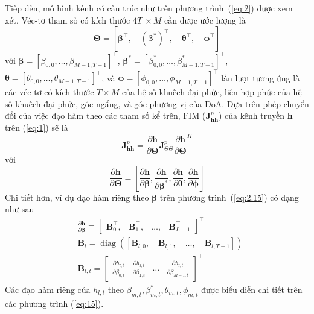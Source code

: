 Tiếp đến, mô hình kênh có cấu trúc như trên phương trình~(\ref{eq:2}) được xem xét. Véc-tơ tham số có kích thước $4T~\times M$ cần được ước lượng là
\begin{equation}
    \boldsymbol{\Theta}=\left[ \boldsymbol{\beta}^\top, \quad \boldsymbol{(\beta^*)}^\top, \quad \boldsymbol{\theta}^\top, \quad \boldsymbol{\phi}^\top \right]
\end{equation}
với $\boldsymbol{\beta}=\left[\beta_{0,0}, \ldots, \beta_{M-1, T -1}\right]^{\top}$, $\boldsymbol{\beta^*}=\left[\beta^*_{0,0}, \ldots, \beta^*_{M-1, T - 1}\right]^{\top}$, $\boldsymbol{\theta}=\left[\theta_{0,0}, \ldots, \theta_{M-1, T - 1}\right]^{\top}$, và $\boldsymbol{\phi}=\left[\phi_{0,0}, \ldots, \phi_{M-1, T - 1}\right]^{\top}$ lần lượt tương ứng là các véc-tơ có kích thước $T \times M$ của hệ số khuếch đại phức, liên hợp phức của hệ số khuếch đại phức, góc ngẩng, và góc phương vị của DoA. Dựa trên phép chuyển đổi của việc đạo hàm theo các tham số kể trên, FIM ($\mathbf{J}^p_{\mathbf{h} \mathbf{h}}$) của kênh truyền $\mathbf{h}$ trên (\ref{eq:1}) sẽ là
\begin{equation}
\label{eq:13}
    \mathbf{J}^p_{\mathbf{h} \mathbf{h}}=\frac{\partial \mathbf{h}}{\partial \boldsymbol{\Theta}} \mathbf{J}^p_{\Theta \Theta} {\frac{\partial \mathbf{h}}{\partial \boldsymbol{\Theta}}}^{H}
\end{equation}
với 
\begin{equation}
\label{eq:2.15}
    \frac{\partial \mathbf{h}}{\partial \boldsymbol{\Theta}}=
    \left[\frac{\partial \mathbf{h}}{\partial \boldsymbol{\beta}}, 
    \frac{\partial \mathbf{h}}{\partial \boldsymbol{\beta^*}},
    \frac{\partial \mathbf{h}}{\partial \boldsymbol{\theta}}, 
    \frac{\partial \mathbf{h}}{\partial \boldsymbol{\phi}}\right]
\end{equation}
Chi tiết hơn, ví dụ đạo hàm riêng theo $\boldsymbol{\beta}$ trên phương trình~(\ref{eq:2.15}) có dạng như sau
\begin{subequations}
    \begin{align}
    &\frac{\partial \mathbf{h}}{\partial \boldsymbol{\beta}}=
    \left[\begin{array}{llll}
        \boldsymbol{B}_{0}^{\top}, & \boldsymbol{B}_{1}^{\top}, & \ldots, & \boldsymbol{B}_{L - 1}^{\top}
    \end{array}\right]^{\top}\\
    &\boldsymbol{B}_{l}=\operatorname{diag}\left(\left[\boldsymbol{B}_{l, 0}, \quad \boldsymbol{B}_{l, 1}, \quad \ldots, \quad \boldsymbol{B}_{l, T - 1}\right]\right) \\
    &\boldsymbol{B}_{l, t}=\left[\begin{array}{cccc}
        \frac{\partial h_{l, t}}{\partial \beta_{0, t}} &
        \frac{\partial h_{l, t}}{\partial \beta_{1, t}} & 
        \ldots & 
        \frac{\partial h_{l, t}}{\partial \beta_{M-1, t}}
    \end{array}\right]^\top
    \end{align}
\end{subequations}
Các đạo hàm riêng của $h_{l, t}$ theo $\beta_{m,t}, \beta^*_{m,t}, \theta_{m, t}, \phi_{m, t}$ được biểu diễn chi tiết trên các phương trình (\ref{eq:15}).

